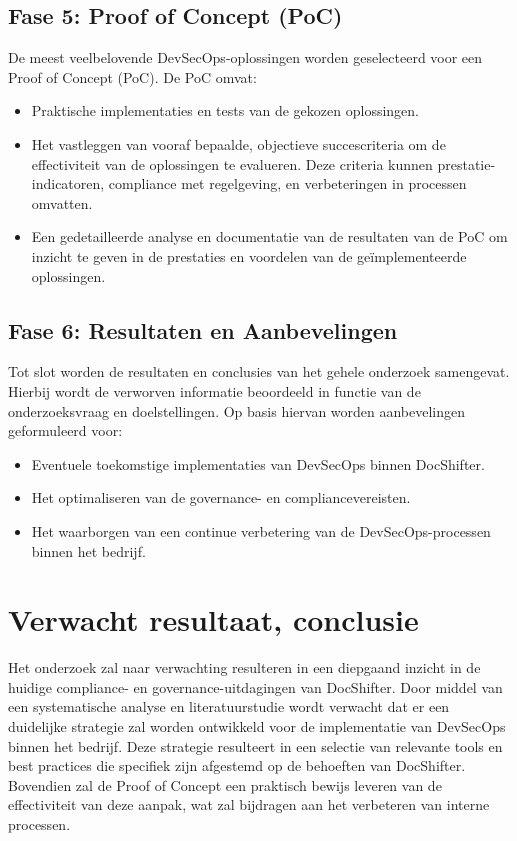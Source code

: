 \documentclass{hogent-article}
\begin{document}
    \subsection{Fase 5: Proof of Concept (PoC)}
    \noindent De meest veelbelovende DevSecOps-oplossingen worden geselecteerd voor een Proof of Concept (PoC). De PoC omvat:
    
    \begin{itemize}
        \item Praktische implementaties en tests van de gekozen oplossingen.
        \item Het vastleggen van vooraf bepaalde, objectieve succescriteria om de effectiviteit van de oplossingen te evalueren. Deze criteria kunnen prestatie-indicatoren, compliance met regelgeving, en verbeteringen in processen omvatten.
        \item Een gedetailleerde analyse en documentatie van de resultaten van de PoC om inzicht te geven in de prestaties en voordelen van de geïmplementeerde oplossingen.
    \end{itemize}

    \subsection{Fase 6: Resultaten en Aanbevelingen}
    \noindent Tot slot worden de resultaten en conclusies van het gehele onderzoek samengevat. Hierbij wordt de verworven informatie beoordeeld in functie van de onderzoeksvraag en doelstellingen. Op basis hiervan worden aanbevelingen geformuleerd voor:
    
    \begin{itemize}
        \item Eventuele toekomstige implementaties van DevSecOps binnen DocShifter.
        \item Het optimaliseren van de governance- en compliancevereisten.
        \item Het waarborgen van een continue verbetering van de DevSecOps-processen binnen het bedrijf.
    \end{itemize}
    
    \section{Verwacht resultaat, conclusie}%
    \label{sec:verwachte_resultaten}
    Het onderzoek zal naar verwachting resulteren in een diepgaand inzicht in de huidige compliance- en governance-uitdagingen van DocShifter. Door middel van een systematische analyse en literatuurstudie wordt verwacht dat er een duidelijke strategie zal worden ontwikkeld voor de implementatie van DevSecOps binnen het bedrijf. Deze strategie resulteert in een selectie van relevante tools en best practices die specifiek zijn afgestemd op de behoeften van DocShifter. Bovendien zal de Proof of Concept een praktisch bewijs leveren van de effectiviteit van deze aanpak, wat zal bijdragen aan het verbeteren van interne processen.
    
\end{document}
